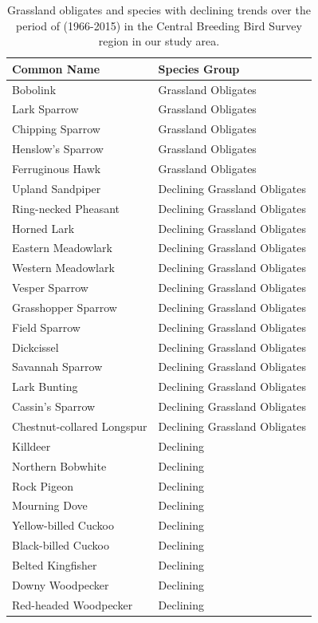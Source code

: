 \documentclass[12pt,twoside,openany]{reedthesis}
\begin{document}
\begin{longtable}{ll}
\caption{\label{tab:sppIntTab}Grassland obligates and species with declining trends over the period of (1966-2015) in the Central Breeding Bird Survey region in our study area.}\\
\toprule
Common Name & Species Group\\
\midrule
Bobolink & Grassland Obligates\\
Lark Sparrow & Grassland Obligates\\
Chipping Sparrow & Grassland Obligates\\
Henslow's Sparrow & Grassland Obligates\\
Ferruginous Hawk & Grassland Obligates\\
\addlinespace
Upland Sandpiper & Declining Grassland Obligates\\
Ring-necked Pheasant & Declining Grassland Obligates\\
Horned Lark & Declining Grassland Obligates\\
Eastern Meadowlark & Declining Grassland Obligates\\
Western Meadowlark & Declining Grassland Obligates\\
\addlinespace
Vesper Sparrow & Declining Grassland Obligates\\
Grasshopper Sparrow & Declining Grassland Obligates\\
Field Sparrow & Declining Grassland Obligates\\
Dickcissel & Declining Grassland Obligates\\
Savannah Sparrow & Declining Grassland Obligates\\
\addlinespace
Lark Bunting & Declining Grassland Obligates\\
Cassin's Sparrow & Declining Grassland Obligates\\
Chestnut-collared Longspur & Declining Grassland Obligates\\
Killdeer & Declining\\
Northern Bobwhite & Declining\\
\addlinespace
Rock Pigeon & Declining\\
Mourning Dove & Declining\\
Yellow-billed Cuckoo & Declining\\
Black-billed Cuckoo & Declining\\
Belted Kingfisher & Declining\\
\addlinespace
Downy Woodpecker & Declining\\
Red-headed Woodpecker & Declining\\

\end{longtable}
\end{document}

